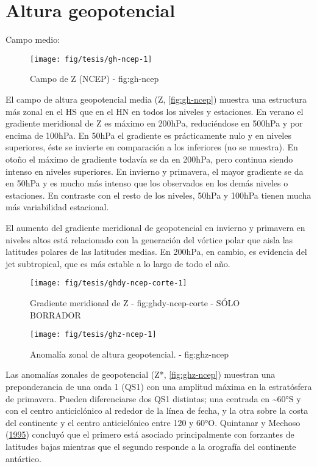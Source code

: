 \documentclass[spanish,a4paper]{book}
\begin{document}
\section{Altura geopotencial}\label{altura-geopotencial}

Campo medio:

\begin{figure}

{\centering \texttt{[image: fig/tesis/gh-ncep-1]} 

}

\caption{Campo de Z (NCEP) - fig:gh-ncep}\label{fig:gh-ncep}
\end{figure}

El campo de altura geopotencial media (Z, \autoref{fig:gh-ncep}) muestra
una estructura más zonal en el HS que en el HN en todos los niveles y
estaciones. En verano el gradiente meridional de Z es máximo en 200hPa,
reduciéndose en 500hPa y por encima de 100hPa. En 50hPa el gradiente es
prácticamente nulo y en niveles superiores, éste se invierte en
comparación a los inferiores (no se muestra). En otoño el máximo de
gradiente todavía se da en 200hPa, pero continua siendo intenso en
niveles superiores. En invierno y primavera, el mayor gradiente se da en
50hPa y es mucho más intenso que los observados en los demás niveles o
estaciones. En contraste con el resto de los niveles, 50hPa y 100hPa
tienen mucha más variabilidad estacional.

El aumento del gradiente meridional de geopotencial en invierno y
primavera en niveles altos está relacionado con la generación del
vórtice polar que aisla las latitudes polares de las latitudes medias.
En 200hPa, en cambio, es evidencia del jet subtropical, que es más
estable a lo largo de todo el año.

\begin{figure}
\texttt{[image: fig/tesis/ghdy-ncep-corte-1]} \caption{Gradiente meridional de Z - fig:ghdy-ncep-corte - SÓLO BORRADOR}\label{fig:ghdy-ncep-corte}
\end{figure}

\begin{figure}

{\centering \texttt{[image: fig/tesis/ghz-ncep-1]} 

}

\caption{Anomalía zonal de altura geopotencial. - fig:ghz-ncep}\label{fig:ghz-ncep}
\end{figure}

Las anomalías zonales de geopotencial (Z*, \autoref{fig:ghz-ncep})
muestran una preponderancia de una onda 1 (QS1) con una amplitud máxima
en la estratósfera de primavera. Pueden diferenciarse dos QS1 distintas;
una centrada en \textasciitilde{}60°S y con el centro anticiclónico al
rededor de la línea de fecha, y la otra sobre la costa del continente y
el centro anticiclónico entre 120 y 60°O. Quintanar y Mechoso
(\protect\hyperlink{ref-Quintanar1995}{1995}) concluyó que el primero
está asociado principalmente con forzantes de latitudes bajas mientras
que el segundo responde a la orografía del continente antártico.
\end{document}
